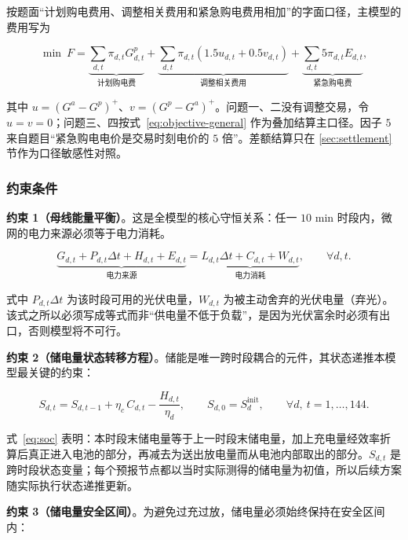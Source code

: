按题面“计划购电费用、调整相关费用和紧急购电费用相加”的字面口径，主模型的费用写为

\begin{equation}
	\min\ F=
	\underbrace{\sum_{d,t}\pi_{d,t}G^{p}_{d,t}}_{\text{计划购电费}}
	+\underbrace{\sum_{d,t}\pi_{d,t}(1.5u_{d,t}+0.5v_{d,t})}_{\text{调整相关费用}}
	+\underbrace{\sum_{d,t}5\pi_{d,t}E_{d,t}}_{\text{紧急购电费}},
	\label{eq:objective-general}
\end{equation}

其中 $u=(G^a-G^p)^+$、$v=(G^p-G^a)^+$。问题一、二没有调整交易，令 $u=v=0$；问题三、四按式~\eqref{eq:objective-general} 作为叠加结算主口径。因子 $5$ 来自题目“紧急购电电价是交易时刻电价的 $5$ 倍”。差额结算只在 \ref{sec:settlement} 节作为口径敏感性对照。

\subsubsection{约束条件}

\textbf{约束 1（母线能量平衡）}。这是全模型的核心守恒关系：任一 $10$ min 时段内，微网的电力来源必须等于电力消耗。

\begin{equation}
	\underbrace{G_{d,t}+P_{d,t}\Delta t+H_{d,t}+E_{d,t}}_{\text{电力来源}}
	=\underbrace{L_{d,t}\Delta t+C_{d,t}+W_{d,t}}_{\text{电力消耗}},
	\qquad \forall d,t .
	\label{eq:balance}
\end{equation}

式中 $P_{d,t}\Delta t$ 为该时段可用的光伏电量，$W_{d,t}$ 为被主动舍弃的光伏电量（弃光）。该式之所以必须写成等式而非“供电量不低于负载”，是因为光伏富余时必须有出口，否则模型将不可行。

\textbf{约束 2（储电量状态转移方程）}。储能是唯一跨时段耦合的元件，其状态递推本模型最关键的约束：

\begin{equation}
	S_{d,t}=S_{d,t-1}+\eta_c\,C_{d,t}-\frac{H_{d,t}}{\eta_d},
	\qquad S_{d,0}=S^{\text{init}}_{d},
	\qquad \forall d,\ t=1,\dots,144 .
	\label{eq:soc}
\end{equation}

式~\eqref{eq:soc} 表明：本时段末储电量等于上一时段末储电量，加上充电量经效率折算后真正进入电池的部分，再减去为送出放电量而从电池内部取出的部分。$S_{d,t}$ 是跨时段状态变量；每个预报节点都以当时实际测得的储电量为初值，所以后续方案随实际执行状态递推更新。

\textbf{约束 3（储电量安全区间）}。为避免过充过放，储电量必须始终保持在安全区间内：

